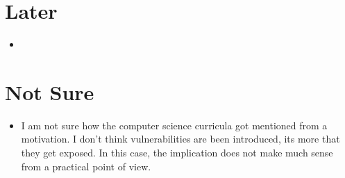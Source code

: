 \documentclass[smallextended]{svjour3}       %
\begin{document}
\section{Later}

\begin{itemize}
	\item 
\end{itemize}

\section{Not Sure}
\begin{itemize}
	\item I am not sure how the computer science curricula got mentioned from a motivation. I don't think vulnerabilities are been introduced, its 
 more that they get exposed. In this case, the implication does not make much sense from a practical point of view.
\end{itemize}
 

\end{document}
